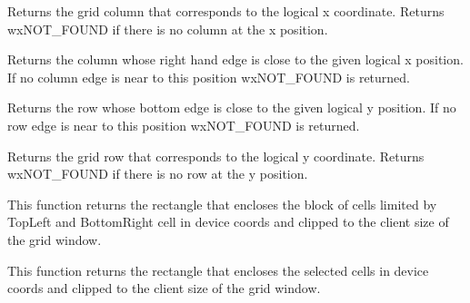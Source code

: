 \label{wxgridxtocol}


Returns the grid column that corresponds to the logical x coordinate. Returns
wxNOT\_FOUND if there is no column at the x position.

\label{wxgridxtoedgeofcol}


Returns the column whose right hand edge is close to the given logical x position.
If no column edge is near to this position wxNOT\_FOUND is returned.

\label{wxgridytoedgeofrow}


Returns the row whose bottom edge is close to the given logical y position.
If no row edge is near to this position wxNOT\_FOUND is returned.

\label{wxgridytorow}


Returns the grid row that corresponds to the logical y coordinate. Returns
wxNOT\_FOUND if there is no row at the y position.



\label{wxgridisinselection}




\label{wxgridblocktodevicerect}


This function returns the rectangle that encloses the block of cells
limited by TopLeft and BottomRight cell in device coords and clipped
to the client size of the grid window.


\label{wxgridselectiontodevicerect}


This function returns the rectangle that encloses the selected cells
in device coords and clipped to the client size of the grid window.


